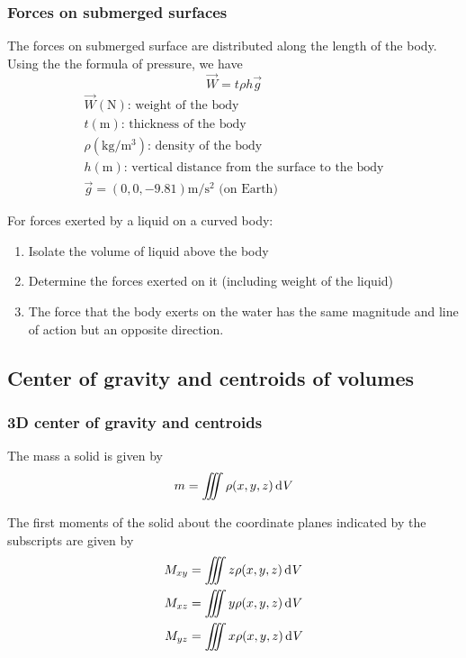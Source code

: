 \documentclass[10pt, twocolumn]{article}
\begin{document}
\subsubsection{Forces on submerged surfaces}
The forces on submerged surface are distributed along the length of the body.
Using the the formula of pressure, we have
\[
  \vec{W} = t \rho h \vec{g}
\]
\[
  \begin{array}{|l}
    \vec{W} (\si{\newton}) \text{: weight of the body}                      \\
    t (\si{\metre}) \text{: thickness of the body}                          \\
    \rho (\si{\kilo\gram\per\metre\cubed}) \text{: density of the body}     \\
    h (\si{\metre}) \text{: vertical distance from the surface to the body} \\
    \vec{g} = (0, 0, -9.81)\si{\metre\per\second\squared} \text{ (on Earth)}
  \end{array}
\]


For forces exerted by a liquid on a curved body:
\begin{enumerate}
  \item Isolate the volume of liquid above the body
  \item Determine the forces exerted on it (including weight of the liquid)
  \item The force that the body exerts on the water has the same magnitude and line of action but an opposite direction.
\end{enumerate}

\subsection{Center of gravity and centroids of volumes}
\subsubsection{3D center of gravity and centroids}
The mass a solid is given by
\[
  m = \iiint{\rho(x, y, z) \,\mathrm{d}^{} V}
\]

The first moments of the solid about the coordinate planes indicated by the subscripts are given by
\begin{align*}
  M_{xy} & = \iiint{z\rho(x, y, z) \,\mathrm{d}^{} V} \\
  M_{xz} & = \iiint{y\rho(x, y, z) \,\mathrm{d}^{} V} \\
  M_{yz} & = \iiint{x\rho(x, y, z) \,\mathrm{d}^{} V}
\end{align*}
\end{document}
